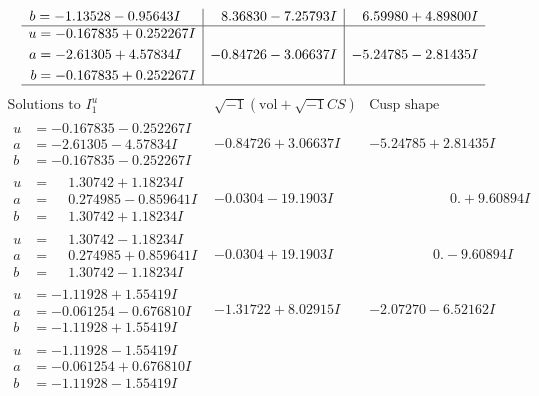 \documentclass[1p]{elsarticle_modified}
\theoremstyle{definition}
\newcommand{\I}{\sqrt{-1}}
\begin{document}
$$\begin{array}{c|c|c}
\begin{aligned}
b &= -1.13528 - 0.95643 I\end{aligned}
 & \phantom{-}8.36830 - 7.25793 I & \phantom{-}6.59980 + 4.89800 I \\ \hline\begin{aligned}
u &= -0.167835 + 0.252267 I \\
a &= -2.61305 + 4.57834 I \\
b &= -0.167835 + 0.252267 I\end{aligned}
 & -0.84726 - 3.06637 I & -5.24785 - 2.81435 I\\
 \hline 
 \end{array}$$\newpage$$\begin{array}{c|c|c}  
\text{Solutions to }I^u_{1}& \I (\text{vol} + \sqrt{-1}CS) & \text{Cusp shape}\\
 \hline 
\begin{aligned}
u &= -0.167835 - 0.252267 I \\
a &= -2.61305 - 4.57834 I \\
b &= -0.167835 - 0.252267 I\end{aligned}
 & -0.84726 + 3.06637 I & -5.24785 + 2.81435 I \\ \hline\begin{aligned}
u &= \phantom{-}1.30742 + 1.18234 I \\
a &= \phantom{-}0.274985 - 0.859641 I \\
b &= \phantom{-}1.30742 + 1.18234 I\end{aligned}
 & -0.0304 - 19.1903 I & \phantom{-0.000000 -}0. + 9.60894 I \\ \hline\begin{aligned}
u &= \phantom{-}1.30742 - 1.18234 I \\
a &= \phantom{-}0.274985 + 0.859641 I \\
b &= \phantom{-}1.30742 - 1.18234 I\end{aligned}
 & -0.0304 + 19.1903 I & \phantom{-0.000000 } 0. - 9.60894 I \\ \hline\begin{aligned}
u &= -1.11928 + 1.55419 I \\
a &= -0.061254 - 0.676810 I \\
b &= -1.11928 + 1.55419 I\end{aligned}
 & -1.31722 + 8.02915 I & -2.07270 - 6.52162 I \\ \hline\begin{aligned}
u &= -1.11928 - 1.55419 I \\
a &= -0.061254 + 0.676810 I \\
b &= -1.11928 - 1.55419 I\end{aligned}

\end{array}$$
\end{document}
